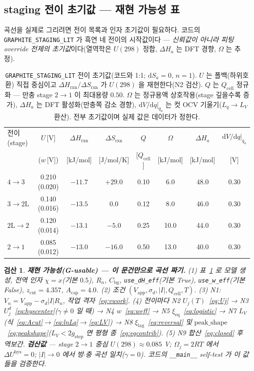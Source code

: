 \documentclass[11pt,a4paper]{article}
\newtheorem*{verifybox}{검산}
\newcommand{\dd}{\mathrm{d}}
\newcommand{\eq}{\mathrm{eq}}
\newcommand{\app}{\mathrm{app}}
\newcommand{\cell}{\mathrm{cell}}
\newcommand{\bg}{\mathrm{bg}}
\newcommand{\lag}{\mathrm{lag}}
\newcommand{\hys}{\mathrm{hys}}
\newcommand{\rxn}{\mathrm{rxn}}
\newcommand{\code}[1]{\texttt{#1}}
\begin{document}
\subsection{staging 전이 초기값 — 재현 가능성 표}\label{sec:stagingtable}
곡선을 실제로 그리려면 전이 목록과 인자 초기값이 필요하다. 코드의 \code{GRAPHITE\_STAGING\_LIT} 가 흑연 네 전이의 시작값이다 — \emph{신뢰값이 아니라 피팅 override 전제의 초기값}이다(열역학은 $U(298)$ 정합, $\Delta H_a$ 는 DFT 경향, $\Omega$ 는 추정).

\begin{table}[t]
\centering
\renewcommand{\arraystretch}{1.25}
\begin{tabular}{l c c c c c c c}
\toprule
전이(stage) & $U$\,[V] & $\Delta H_\rxn$ & $\Delta S_\rxn$ & $Q$ & $\Omega$ & $\Delta H_a$ & $\dd V/\dd q|_{q_a}$ \\
 & ($w$\,[V]) & [kJ/mol] & [J/mol/K] & [$Q_\cell$] & [kJ/mol] & [kJ/mol] & [V] \\
\midrule
$4\!\to\!3$    & 0.210 (0.020) & $-11.7$ & $+29.0$ & 0.10 & 6.0  & 48.0 & 0.30 \\
$3\!\to\!2\mathrm L$ & 0.140 (0.016) & $-13.5$ & $0.0$   & 0.12 & 8.0  & 46.0 & 0.30 \\
$2\mathrm L\!\to\!2$ & 0.120 (0.014) & $-13.1$ & $-5.0$  & 0.25 & 10.0 & 44.0 & 0.30 \\
$2\!\to\!1$    & 0.085 (0.012) & $-13.0$ & $-16.0$ & 0.50 & 13.0 & 40.0 & 0.30 \\
\bottomrule
\end{tabular}
\caption{\code{GRAPHITE\_STAGING\_LIT} 전이 초기값(코드와 1:1; $\dd S_a=0$, $n=1$). $U$ 는 폴백(하위호환) 직접 중심이고 $\Delta H_\rxn/\Delta S_\rxn$ 가 $U(298)$ 을 재현한다(N2 검산). $Q$ 는 $Q_\cell$ 정규화 — 만충 stage $2\!\to\!1$ 이 최대용량 $0.50$. $\Omega$ 는 정규용액 상호작용(stage 깊을수록 증가), $\Delta H_a$ 는 DFT 활성화(만충쪽 감소 경향), $\dd V/\dd q|_{q_a}$ 는 컷 OCV 기울기($L_q\!\to\!L_V$ 환산). 전부 초기값이며 실제 값은 데이터가 정한다.}
\label{tab:staging}
\end{table}

\begin{verifybox}
\textbf{재현 가능성(G-usable) — 이 문건만으로 곡선 짜기.} (1) 표~\ref{tab:staging} 로 모델 생성, 전역 인자 $\chi=x$(기본 $0.5$), $R_n$, $C_\bg$, \code{use\_dH\_eff}(기본 True), \code{use\_w\_eff}(기본 False), $z_\mathrm{cut}=4.357$, $A_\mathrm{cap}=4.0$. (2) 조건 $(V_\app,\sigma_d,|I|,Q_\cell,T)$. (3) N1: $V_n=V_\app-\sigma_d|I|R_n$, 작업 격자~\eqref{eq:vwork}. (4) 전이마다 N2 $U_j(T)$~\eqref{eq:Uj} → N3 $U_j^d$~\eqref{eq:hyscenter}($\gamma\ne0$ 일 때) → N4 $w$~\eqref{eq:weff} → N5 $\xi_\eq$~\eqref{eq:logistic} → N7 $L_V$(식~\eqref{eq:Acut}$\to$\eqref{eq:lnLq}$\to$\eqref{eq:LV}) → N8 $\xi_\lag$~\eqref{eq:reversal} 및 $\text{peak\_shape}$~\eqref{eq:peakshape}($L_V<2g_\mathrm{step}$ 면 평형 종~\eqref{eq:eqcontrib}). (5) N9 합산~\eqref{eq:closed} 후 역보간. \textbf{검산값} — stage $2\!\to\!1$ 중심 $U(298)\approx0.085$ V; $\Omega_j=2RT$ 에서 $\Delta U^\hys=0$; $|I|\to0$ 에서 방$\cdot$충 곡선 일치($\gamma=0$). 코드의 \code{\_\_main\_\_} self-test 가 이 값들을 검증한다.
\end{verifybox}
\end{document}
